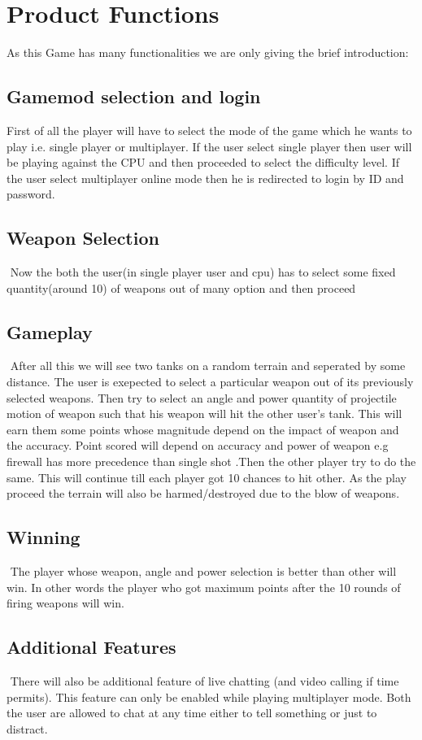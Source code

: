 \documentclass{scrreprt}
\begin{document}
\section{Product Functions}
$ $As this Game has many functionalities we are only giving the brief introduction:$ $
\subsection{Gamemod selection and login}
$ $First of all the player will have to select the mode of the game which he wants to play i.e. single player or multiplayer. If the user select single player then user will be playing against the CPU and then proceeded to select the difficulty level. If the user select multiplayer online mode then he is redirected to login by ID and password. $ $
\subsection{Weapon Selection}
$ $ Now the both the user(in single player user and cpu) has to select some fixed quantity(around 10) of weapons out of many option and then proceed $ $
\subsection{Gameplay}
$ $ After all this we will see two tanks on a random terrain and seperated by some distance. The user is exepected to select a particular weapon out of its previously selected weapons. Then try to select an angle and power quantity of projectile motion of weapon such that his weapon will hit the other user's tank. This will earn them some points whose magnitude depend on the impact of weapon and the accuracy. Point scored will depend on accuracy and power of weapon e.g firewall has more precedence than single shot .Then the other player try to do the same. This will continue till each player got 10 chances to hit other. As the play proceed the terrain will also be harmed/destroyed due to the blow of weapons.$ $
\subsection{Winning}
$ $ The player whose weapon, angle and power selection is better than other will win. In other words the player who got maximum points after the 10 rounds of firing weapons will win. $ $
\subsection{Additional Features}
$ $ There will also be additional feature of live chatting (and video calling if time permits). This feature can only be enabled while playing multiplayer mode. Both the user are allowed to chat at any time either to tell something or just to distract. $ $
\end{document}
